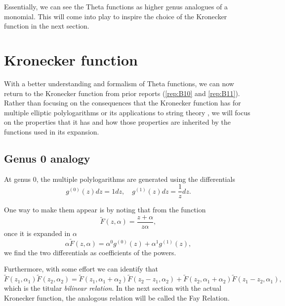 Essentially, we can see the Theta functions as higher genus analogues of a monomial. This will come into play to inspire the choice of the Kronecker function in the next section.

\section{Kronecker function}\label{secB12:Kronecker}

With a better understanding and formalism of Theta functions, we can now return to the Kronecker function from prior reports (\ref{rep:B10} and \ref{rep:B11}). Rather than focusing on the consequences that the Kronecker function has for multiple elliptic polylogarithms \cite{BL13} or its applications to string theory \cite{Broedel_2022}, we will focus on the properties that it has and how those properties are inherited by the functions used in its expansion.

\subsection{Genus 0 analogy}

At genus 0, the multiple polylogarithms are generated using the differentials
\begin{equation}
    g^{(0)}(z)dz = 1 dz , \quad g^{(1)}(z)dz = \frac{1}{z} dz.
\end{equation}

One way to make them appear is by noting that from the function
\begin{equation}
    \tilde F(z,\alpha) = \frac{z+\alpha}{z\alpha},
\end{equation}
once it is expanded in $\alpha$
\begin{equation}\label{eqnB12:ExpandExample}
    \alpha \tilde{F}(z,\alpha) = \alpha^0 g^{(0)}(z) + \alpha^1 g^{(1)}(z),
\end{equation}
we find the two differentials as coefficients of the powers.

Furthermore, with some effort we can identify that
\begin{equation}
    \tilde{F}(z_1,\alpha_1)\tilde{F}(z_2,\alpha_2) = \tilde{F}(z_1,\alpha_1+\alpha_2)\tilde{F}(z_2-z_1,\alpha_2) + \tilde{F}(z_2,\alpha_1+\alpha_2)\tilde{F}(z_1-z_2,\alpha_1),
\end{equation}
which is the titular \emph{bilinear relation}. In the next section with the actual Kronecker function, the analogous relation will be called the Fay Relation.

